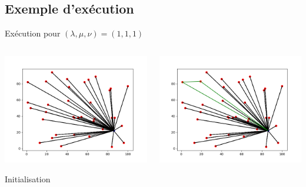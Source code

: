 \documentclass{beamer}
\begin{document}
\subsection{Exemple d'exécution}
\begin{frame}{Exécution pour $(\lambda,\mu,\nu) = (1,1,1)$}

 \begin{columns}[t]
  \begin{column}{4cm}
  	\centering
	\includegraphics[scale=0.25]{CWinit.png}
	
	Initialisation
  \end{column}
  
  \begin{column}{4cm}
  	\centering
	\includegraphics[scale=0.25]{CW1.png}
 

\end{column}
\end{columns}
\end{frame}
\end{document}

